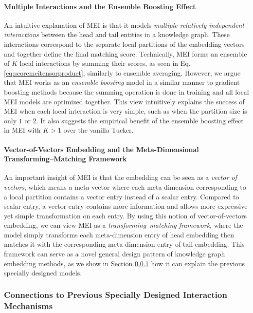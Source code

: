 \documentclass{ecai}
\theoremstyle{plain}  \newtheorem{thm}{Theorem}  \newtheorem{lem}[thm]{Lemma}  \newtheorem{prop}[thm]{Proposition}
\theoremstyle{remark}  \newtheorem*{rem}{Remark}
\begin{document}
\paragraph{Multiple Interactions and the Ensemble Boosting Effect}
An intuitive explanation of MEI is that it models \textit{multiple relatively independent interactions} between the head and tail entities in a knowledge graph. These interactions correspond to the separate local partitions of the embedding vectors and together define the final matching score. Technically, MEI forms an ensemble of $ K $ local interactions by summing their scores, as seen in Eq. \ref{eq:scoremeitensorproduct}, similarly to ensemble averaging. However, we argue that MEI works as an \textit{ensemble boosting} model in a similar manner to gradient boosting methods because the summing operation is done in training and all local MEI models are optimized together. This view intuitively explains the success of MEI when each local interaction is very simple, such as when the partition size is only $ 1 $ or $ 2 $. It also suggests the empirical benefit of the ensemble boosting effect in MEI with $ K > 1 $ over the vanilla Tucker.



\paragraph{Vector-of-Vectors Embedding and the Meta-Dimensional Transforming--Matching Framework}
An important insight of MEI is that the embedding can be seen as a \textit{vector of vectors}, which means a meta-vector where each meta-dimension corresponding to a local partition contains a vector entry instead of a scalar entry. Compared to scalar entry, a vector entry contains more information and allows more expressive yet simple transformation on each entry. By using this notion of vector-of-vectors embedding, we can view MEI as a \textit{transforming--matching framework}, where the model simply transforms each meta-dimension entry of head embedding then matches it with the corresponding meta-dimension entry of tail embedding. This framework can serve as a novel general design pattern of knowledge graph embedding methods, as we show in Section \ref{sect:connection} how it can explain the previous specially designed models.



\subsubsection{Connections to Previous Specially Designed Interaction Mechanisms}\label{sect:connection}
\end{document}
